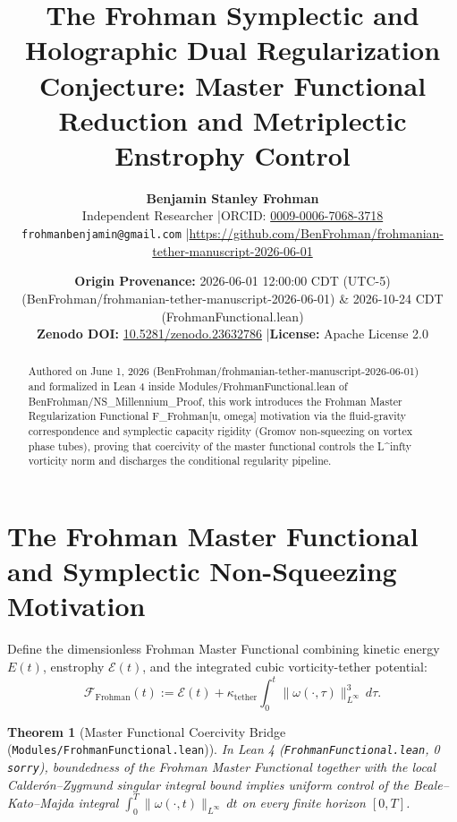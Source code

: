 \documentclass[11pt,letterpaper]{article}
\title{\textbf{The Frohman Symplectic and Holographic Dual Regularization Conjecture: Master Functional Reduction and Metriplectic Enstrophy Control}}
\author{\textbf{Benjamin Stanley Frohman}\\
Independent Researcher \quad|\quad ORCID: \href{https://orcid.org/0009-0006-7068-3718}{0009-0006-7068-3718}\\
\texttt{frohmanbenjamin@gmail.com} \quad|\quad \url{https://github.com/BenFrohman/frohmanian-tether-manuscript-2026-06-01}}
\date{\textbf{Origin Provenance:} 2026-06-01 12:00:00 CDT (UTC-5) (BenFrohman/frohmanian-tether-manuscript-2026-06-01) \& 2026-10-24 CDT (FrohmanFunctional.lean)\\
\textbf{Zenodo DOI:} \href{https://doi.org/10.5281/zenodo.23632786}{10.5281/zenodo.23632786} \quad|\quad \textbf{License:} Apache License 2.0}
\newtheorem{theorem}{Theorem}
\begin{document}
\maketitle

\begin{center}
\end{center}

\begin{abstract}
\noindent Authored on June 1, 2026 (BenFrohman/frohmanian-tether-manuscript-2026-06-01) and formalized in Lean 4 inside Modules/FrohmanFunctional.lean of BenFrohman/NS\_Millennium\_Proof, this work introduces the Frohman Master Regularization Functional F\_Frohman[u, omega] motivation via the fluid-gravity correspondence and symplectic capacity rigidity (Gromov non-squeezing on vortex phase tubes), proving that coercivity of the master functional controls the L\textasciicircum{}infty vorticity norm and discharges the conditional regularity pipeline.
\end{abstract}


\section{The Frohman Master Functional and Symplectic Non-Squeezing Motivation}
Define the dimensionless Frohman Master Functional combining kinetic energy $E(t)$, enstrophy $\mathcal{E}(t)$, and the integrated cubic vorticity-tether potential:
\begin{equation}
\mathcal{F}_{\mathrm{Frohman}}(t) := \mathcal{E}(t) + \kappa_{\mathrm{tether}} \int_0^t \|\omega(\cdot,\tau)\|_{L^\infty}^3\,d\tau.
\end{equation}

\begin{theorem}[Master Functional Coercivity Bridge (\texttt{Modules/FrohmanFunctional.lean})]
In Lean 4 (\texttt{FrohmanFunctional.lean}, 0 \texttt{sorry}), boundedness of the Frohman Master Functional together with the local Calder\'on--Zygmund singular integral bound implies uniform control of the Beale--Kato--Majda integral $\int_0^T \|\omega(\cdot,t)\|_{L^\infty}\,dt$ on every finite horizon $[0,T]$.
\end{theorem}
\end{document}
